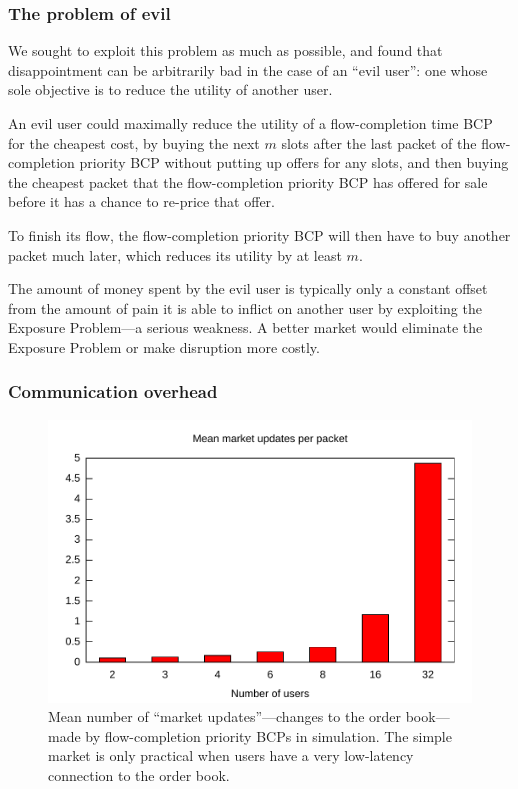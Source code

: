 \subsubsection{The problem of evil}
\label{ss:evil}
We sought to exploit this problem as much as possible, and found that
disappointment can be arbitrarily bad in the case of an ``evil user'':
one whose sole objective is to reduce the utility of another
user.

An evil user could maximally reduce the utility of a flow-completion
time BCP for the cheapest cost, by buying the next $m$ slots after the
last packet of the flow-completion priority BCP without putting up
offers for any slots, and then buying the cheapest packet that the
flow-completion priority BCP has offered for sale before it has a
chance to re-price that offer.

To finish its flow, the flow-completion priority BCP
will then have to buy another packet much later, which reduces its
utility by at least $m$.

The amount of money spent by the evil user is typically only a
constant offset from the amount of pain it is able to inflict on
another user by exploiting the Exposure Problem---a serious
weakness. A better market would eliminate the Exposure Problem or make
disruption more costly.

\subsubsection{Communication overhead}

\begin{figure}
\includegraphics[width=\columnwidth]{plots/num_market_updates.pdf}
\caption{Mean number of ``market updates''---changes to the order book---made by flow-completion
priority BCPs in simulation. The simple market is only practical when
users have a very low-latency connection to the order book.}
\label{f:num_market_updates}
\end{figure}

